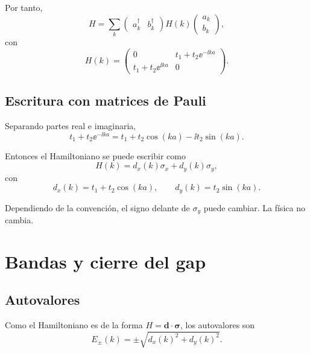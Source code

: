 Por tanto,
\begin{equation}
H=\sum_k
\begin{pmatrix}
a_k^\dagger & b_k^\dagger
\end{pmatrix}
H(k)
\begin{pmatrix}
a_k\\
b_k
\end{pmatrix},
\end{equation}
con
\begin{equation}
H(k)=
\begin{pmatrix}
0 & t_1+t_2\ee^{-\ii k a}\\
t_1+t_2\ee^{\ii k a} & 0
\end{pmatrix}.
\label{c01:eq:ssh-bloch}
\end{equation}

\subsection{Escritura con matrices de Pauli}

Separando partes real e imaginaria,
\begin{equation}
t_1+t_2\ee^{-\ii ka}
=
t_1+t_2\cos(ka)-\ii t_2\sin(ka).
\end{equation}

Entonces el Hamiltoniano se puede escribir como
\begin{equation}
H(k)= d_x(k)\sigma_x + d_y(k)\sigma_y,
\end{equation}
con
\begin{equation}
d_x(k)=t_1+t_2\cos(ka),
\qquad
d_y(k)=t_2\sin(ka).
\label{c01:eq:ssh-dxdy}
\end{equation}

Dependiendo de la convención, el signo delante de \(\sigma_y\) puede cambiar. La física no cambia.

\section{Bandas y cierre del gap}

\subsection{Autovalores}

Como el Hamiltoniano es de la forma \(H=\bm{d}\cdot\bm{\sigma}\), los autovalores son
\begin{equation}
E_\pm(k)=\pm \sqrt{d_x(k)^2+d_y(k)^2}.
\end{equation}

